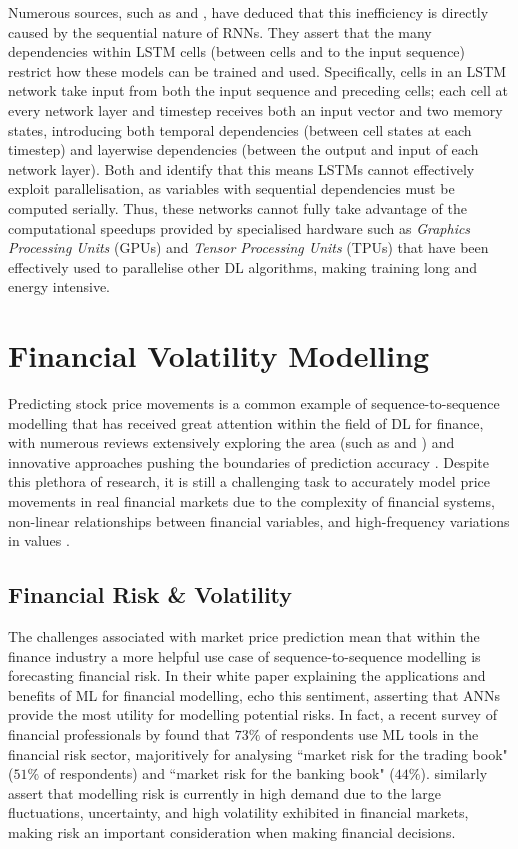 \documentclass[a4paper, 11pt]{report}
\begin{document}
    Numerous sources, such as \citet{cao-2017} and \citet{feliz-2021}, have deduced that this inefficiency is directly caused by the sequential nature of RNNs. They assert that the many dependencies within LSTM cells (between cells and to the input sequence) restrict how these models can be trained and used. Specifically, cells in an LSTM network take input from both the input sequence and preceding cells; each cell at every network layer and timestep receives both an input vector and two memory states, introducing both temporal dependencies (between cell states at each timestep) and layerwise dependencies (between the output and input of each network layer). Both \citet{cao-2017} and \citet{feliz-2021} identify that this means LSTMs cannot effectively exploit parallelisation, as variables with sequential dependencies must be computed serially. Thus, these networks cannot fully take advantage of the computational speedups provided by specialised hardware such as \emph{Graphics Processing Units} (GPUs) and \emph{Tensor Processing Units} (TPUs) that have been effectively used to parallelise other DL algorithms, making training long and energy intensive.


    \section{Financial Volatility Modelling}

    Predicting stock price movements is a common example of sequence-to-sequence modelling that has received great attention within the field of DL for finance, with numerous reviews extensively exploring the area (such as \citet{sezer-2019} and \citet{jiang-2021}) and innovative approaches pushing the boundaries of prediction accuracy \citep{darapaneni-2022}. Despite this plethora of research, it is still a challenging task to accurately model price movements in real financial markets due to the complexity of financial systems, non-linear relationships between financial variables, and high-frequency variations in values \citep{timmermann-2004}.


    \subsection{Financial Risk \& Volatility}

    The challenges associated with market price prediction mean that within the finance industry a more helpful use case of sequence-to-sequence modelling is forecasting financial risk. In their white paper explaining the applications and benefits of ML for financial modelling, \citet{laplante-2019} echo this sentiment, asserting that ANNs provide the most utility for modelling potential risks. In fact, a recent survey of financial professionals by \citet{chartis-2019} found that $73\%$ of respondents use ML tools in the financial risk sector, majoritively for analysing ``market risk for the trading book" ($51\%$ of respondents) and ``market risk for the banking book" ($44\%$). \citet{peng-2021} similarly assert that modelling risk is currently in high demand due to the large fluctuations, uncertainty, and high volatility exhibited in financial markets, making risk an important consideration when making financial decisions.
\end{document}
